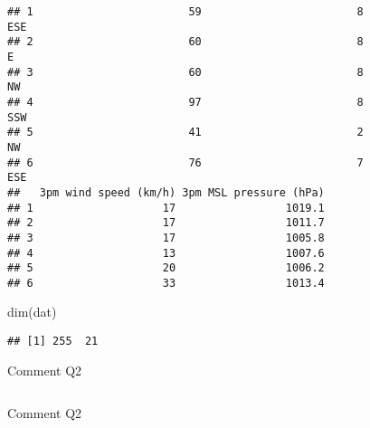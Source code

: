 \documentclass[
]{article}
\newenvironment{Shaded}{\begin{snugshade}}{\end{snugshade}}
\newcommand{\FunctionTok}[1]{\textcolor[rgb]{0.00,0.00,0.00}{#1}}
\newcommand{\NormalTok}[1]{#1}
\begin{document}
\begin{verbatim}
## 1                        59                        8                ESE
## 2                        60                        8                  E
## 3                        60                        8                 NW
## 4                        97                        8                SSW
## 5                        41                        2                 NW
## 6                        76                        7                ESE
##   3pm wind speed (km/h) 3pm MSL pressure (hPa)
## 1                    17                 1019.1
## 2                    17                 1011.7
## 3                    17                 1005.8
## 4                    13                 1007.6
## 5                    20                 1006.2
## 6                    33                 1013.4
\end{verbatim}

\begin{Shaded}
\begin{Highlighting}[]
\FunctionTok{dim}\NormalTok{(dat)}
\end{Highlighting}
\end{Shaded}

\begin{verbatim}
## [1] 255  21
\end{verbatim}

Comment Q2

\begin{verbatim}
\end{verbatim}

Comment Q2
\end{document}
